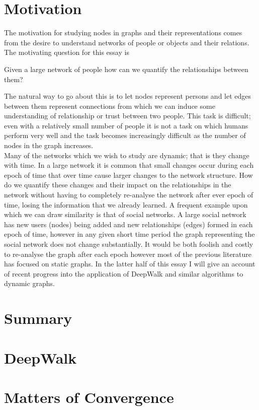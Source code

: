 \documentclass[a4paper]{article}
\begin{document}


\tableofcontents

\section{Motivation}
The motivation for studying nodes in graphs and their representations comes from the desire to understand networks of people or objects and their relations. The motivating question for this essay is
\begin{question}
Given a large network of people how can we quantify the relationships between them?
\end{question}
The natural way to go about this is to let nodes represent persons and let edges between them represent connections from which we can induce some understanding of relationship or trust between two people. This task is difficult; even with a relatively small number of people it is not a task on which humans perform very well and the task becomes increasingly difficult as the number of nodes in the graph increases.\\
Many of the networks which we wish to study are dynamic; that is they change with time. In a large network it is common that small changes occur during each epoch of time that over time cause larger changes to the network structure. How do we quantify these changes and their impact on the relationships in the network without having to completely re-analyse the network after ever epoch of time, losing the information that we already learned. A frequent example upon which we can draw similarity is that of social networks. A large social network has new users (nodes) being added and new relationships (edges) formed in each epoch of time, however in any given short time period the graph representing the social network does not change substantially. It would be both foolish and costly to re-analyse the graph after each epoch however most of the previous literature has focused on static graphs. In the latter half of this essay I will give an account of recent progress into the application of DeepWalk and similar algorithms to dynamic graphs.
\section{Summary}
\section{DeepWalk}
\section{Matters of Convergence}
\end{document}
